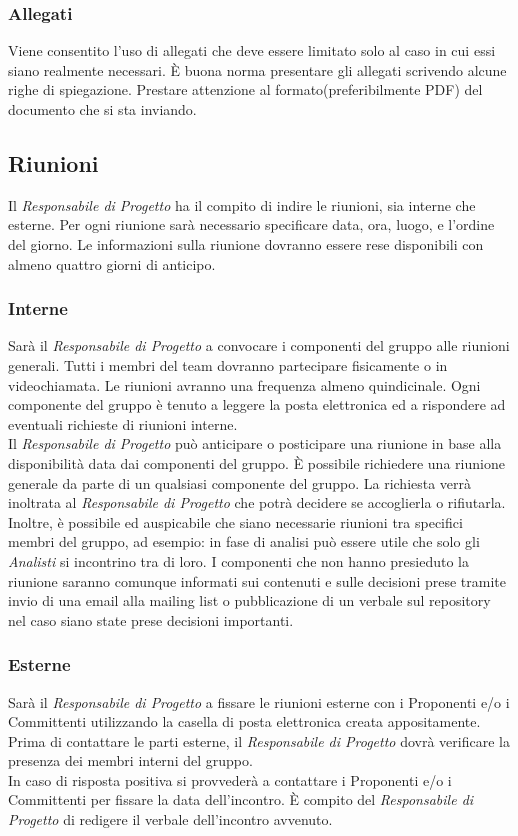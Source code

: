 		\subsubsection{Allegati}
Viene consentito l'uso di allegati che deve essere limitato solo al caso in cui essi siano realmente necessari. È buona norma presentare gli allegati scrivendo alcune righe di spiegazione. Prestare attenzione al formato(preferibilmente PDF) del documento che si sta inviando. 

	\subsection{Riunioni}
Il \textit{Responsabile di Progetto} ha il compito di indire le riunioni, sia interne che esterne. Per ogni riunione sarà necessario specificare data, ora, luogo, e l'ordine del giorno. Le informazioni sulla riunione dovranno essere rese disponibili con almeno quattro giorni di anticipo.
		\subsubsection{Interne}
Sarà il \textit{Responsabile di Progetto} a convocare i componenti del gruppo alle riunioni generali. Tutti i membri del team dovranno partecipare fisicamente o in videochiamata. Le riunioni avranno una frequenza almeno quindicinale. Ogni componente del gruppo è tenuto a leggere la posta elettronica ed a rispondere ad eventuali richieste di riunioni interne. \\
Il \textit{Responsabile di Progetto} può anticipare o posticipare una riunione in base alla disponibilità data dai componenti del gruppo. È possibile richiedere una riunione generale da parte di un qualsiasi componente del gruppo. La richiesta verrà inoltrata al \textit{Responsabile di Progetto} che potrà decidere se accoglierla o rifiutarla.\\
Inoltre, è possibile ed auspicabile che siano necessarie riunioni tra specifici membri del gruppo, ad esempio: in fase di analisi può essere utile che solo gli \textit{Analisti} si incontrino tra di loro. I componenti che non hanno presieduto la riunione saranno comunque informati sui contenuti e sulle decisioni prese tramite invio di una email alla mailing list o pubblicazione di un \gls{verbale} sul \gls{repository} nel caso siano state prese decisioni importanti.
		\subsubsection{Esterne}
Sarà il \textit{Responsabile di Progetto} a fissare le riunioni esterne con i Proponenti e/o i Committenti utilizzando la casella di posta elettronica creata appositamente. Prima di contattare le parti esterne, il \textit{Responsabile di Progetto} dovrà verificare la presenza dei membri interni del gruppo. \\
In caso di risposta positiva si provvederà a contattare i Proponenti e/o i Committenti per fissare la data dell'incontro.
È compito del \textit{Responsabile di Progetto} di redigere il \gls{verbale} dell'incontro avvenuto.

